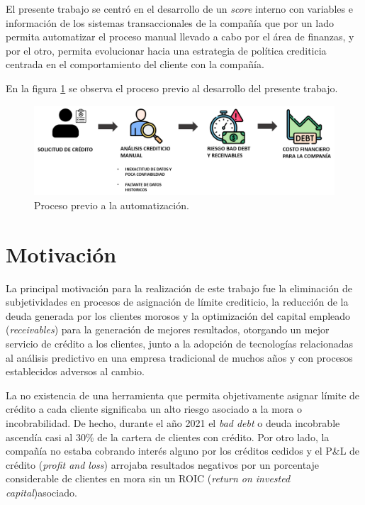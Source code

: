 El presente trabajo se centró en el desarrollo de un \textit{score} interno con variables e información de los sistemas transaccionales de la compañía que por un lado permita automatizar el proceso manual llevado a cabo por el área de finanzas, y por el otro, permita evolucionar hacia una estrategia de política crediticia centrada en el comportamiento del cliente con la compañía. 

En la figura \ref{fig:Proceso actual}  se observa el proceso previo al desarrollo del presente trabajo.

\vspace{1cm}
\begin{figure}[htbp]
	\centering
	\includegraphics[width=1.0\textwidth]{./Figures/Figura2.png}
	\caption{Proceso previo a la automatización.}
	\label{fig:Proceso actual}
\end{figure}
\vspace{1cm}



\section{Motivación}


La principal motivación para la realización de este trabajo fue la eliminación de subjetividades en procesos de asignación de límite crediticio, la reducción de la deuda generada por los clientes morosos y la optimización del capital empleado (\textit{receivables}) para la generación de mejores resultados, otorgando un mejor servicio de crédito a los clientes, junto a la adopción de tecnologías relacionadas al análisis predictivo en una empresa tradicional de muchos años y con procesos establecidos adversos al cambio.

La no existencia de una herramienta que permita objetivamente asignar límite de crédito a cada cliente significaba un alto riesgo asociado a la mora o incobrabilidad. De hecho, durante el año 2021 el \textit{bad debt} o deuda incobrable ascendía casi al 30\% de la cartera de clientes con crédito. Por otro lado, la compañía no estaba cobrando interés alguno por los créditos cedidos y el P\&L de crédito (\textit{profit and loss}) arrojaba resultados negativos por un porcentaje considerable de clientes en mora sin un ROIC (\textit{return on invested capital})asociado.

